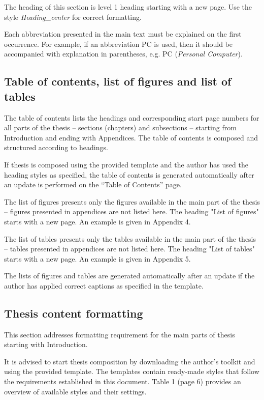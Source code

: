 The heading of this section is level 1 heading starting with a new
page. Use the style \textit{Heading\_center} for correct formatting.

Each abbreviation presented in the main text must be explained on the
first occurrence.  For example, if an abbreviation PC is used, then it
should be accompanied with explanation in parentheses, e.g. PC
(\textit{Personal Computer}).

\subsection{Table of contents, list of figures and list of tables}

The table of contents lists the headings and corresponding start page
numbers for all parts of the thesis – sections (chapters) and
subsections – starting from Introduction and ending with
Appendices. The table of contents is composed and structured according
to headings.

If thesis is composed using the provided template and the author has
used the heading styles as specified, the table of contents is
generated automatically after an update is performed on the “Table of
Contents” page.

The list of figures presents only the figures available in the main
part of the thesis -- figures presented in appendices are not listed
here. The heading "List of figures" starts with a new page. An example
is given in Appendix 4.

The list of tables presents only the tables available in the main part
of the thesis -- tables presented in appendices are not listed
here. The heading "List of tables" starts with a new page. An example
is given in Appendix 5.

The lists of figures and tables are generated automatically after an
update if the author has applied correct captions as specified in the
template.

\subsection{Thesis content formatting}

This section addresses formatting requirement for the main parts of
thesis starting with Introduction.

It is advised to start thesis composition by downloading the author’s
toolkit and using the provided template. The templates contain
ready-made styles that follow the requirements established in this
document. Table 1 (page 6) provides an overview of available styles
and their settings.



